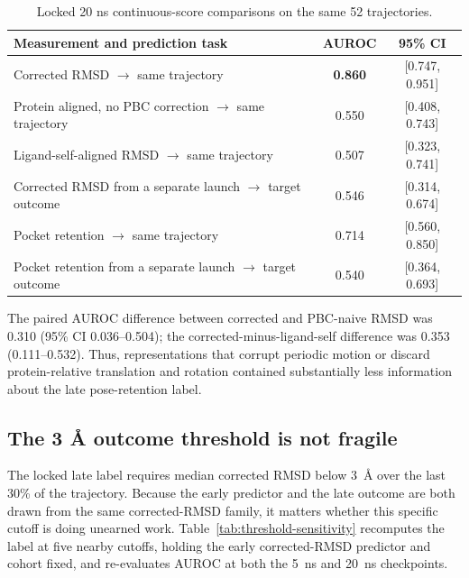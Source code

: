 \documentclass[11pt]{article}
\begin{document}
\begin{table}[htbp]
\centering
\caption{Locked 20 ns continuous-score comparisons on the same 52 trajectories.}
\label{tab:locked-comparisons}
\begin{tabularx}{\textwidth}{Xcc}
\toprule
Measurement and prediction task & AUROC & 95\% CI \\
\midrule
Corrected RMSD $\rightarrow$ same trajectory & \textbf{0.860} & [0.747, 0.951] \\
Protein aligned, no PBC correction $\rightarrow$ same trajectory & 0.550 & [0.408, 0.743] \\
Ligand-self-aligned RMSD $\rightarrow$ same trajectory & 0.507 & [0.323, 0.741] \\
Corrected RMSD from a separate launch $\rightarrow$ target outcome & 0.546 & [0.314, 0.674] \\
Pocket retention $\rightarrow$ same trajectory & 0.714 & [0.560, 0.850] \\
Pocket retention from a separate launch $\rightarrow$ target outcome & 0.540 & [0.364, 0.693] \\
\bottomrule
\end{tabularx}
\end{table}

The paired AUROC difference between corrected and PBC-naive RMSD was 0.310 (95\% CI 0.036--0.504); the corrected-minus-ligand-self difference was 0.353 (0.111--0.532). Thus, representations that corrupt periodic motion or discard protein-relative translation and rotation contained substantially less information about the late pose-retention label.

\subsection{The 3 \AA{} outcome threshold is not fragile}

The locked late label requires median corrected RMSD below 3~\AA{} over the last 30\% of the trajectory. Because the early predictor and the late outcome are both drawn from the same corrected-RMSD family, it matters whether this specific cutoff is doing unearned work. Table~\ref{tab:threshold-sensitivity} recomputes the label at five nearby cutoffs, holding the early corrected-RMSD predictor and cohort fixed, and re-evaluates AUROC at both the 5~ns and 20~ns checkpoints.
\end{document}
